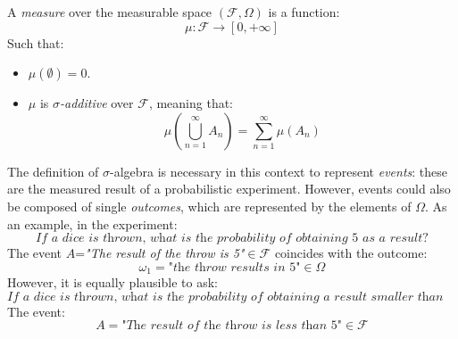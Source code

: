                             \begin{definition}\label{measure}
                                A \textit{measure} over the measurable space $\left(\mathcal{F},\Omega\right)$ is a function:
                                \begin{equation*}
                                    \mu:\mathcal{F} \rightarrow [0,+\infty]
                                \end{equation*}
                                Such that:
                                \begin{itemize}
                                    \item $\mu(\emptyset)=0$.
                                    \item $\mu$ is $\sigma$\textit{-additive} over $\mathcal{F}$, meaning that:
                                    \begin{equation*}
                                        \mu\left(\bigcup_{n=1}^{\infty}A_n\right)=\sum_{n=1}^{\infty}\mu(A_n)
                                    \end{equation*}
                                \end{itemize}
                            \end{definition}
                            The definition of $\sigma$-algebra is necessary in this context to represent \textit{events}: these are the measured result of a probabilistic experiment. However, events could also be composed of single \textit{outcomes}, which are represented by the elements of $\Omega$. As an example, in the experiment:
                            \begin{equation*}
                                \textit{If a dice is thrown, what is the probability of obtaining 5 as a result?}
                            \end{equation*}
                            The event $A$=\textit{"The result of the throw is 5"}$\in\mathcal{F}$ coincides with the outcome:
                            \[\omega_1=\textit{"the throw results in 5"}\in\Omega\]
                            However, it is equally plausible to ask:
                            \begin{equation*}
                                \textit{If a dice is thrown, what is the probability of obtaining a result smaller than 5?}
                            \end{equation*}
                            The event:
                            \[A=\textit{"The result of the throw is less than 5"}\in\mathcal{F}\]
